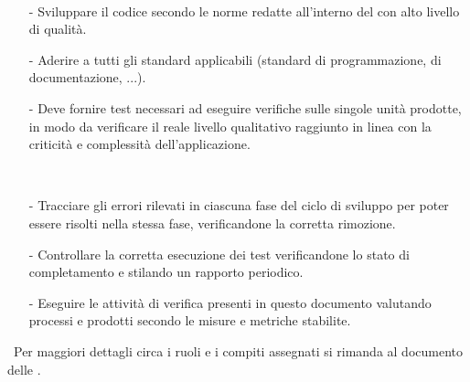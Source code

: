 \documentclass[a4paper, titlepage]{article}
\begin{document}
\begin{description}
\begin{itemize}
\end{itemize}
\ 
\item {}
\begin{itemize}
\item[-] Sviluppare il codice secondo le norme redatte all'interno del  con alto livello di qualità.
\item[-] Aderire a tutti gli standard applicabili (standard di programmazione, di documentazione, ...).
\item[-] Deve fornire test necessari ad eseguire verifiche sulle singole unità prodotte, in modo da verificare il reale livello
qualitativo raggiunto in linea con la criticità e complessità dell’applicazione.
\end{itemize}
\ 
\item {}
\begin{itemize}
\item[-] Tracciare gli errori rilevati in ciascuna fase del ciclo di sviluppo per poter essere risolti nella stessa fase, verificandone la corretta rimozione.
\item[-] Controllare la corretta esecuzione dei test verificandone lo stato di completamento e stilando un rapporto periodico. 
\item[-] Eseguire le attività di verifica presenti in questo documento valutando processi e prodotti secondo le misure e metriche stabilite.
\end{itemize}

\end{description}
\ 
\newline Per maggiori dettagli circa i ruoli e i compiti assegnati si rimanda al documento delle .
\end{document}
